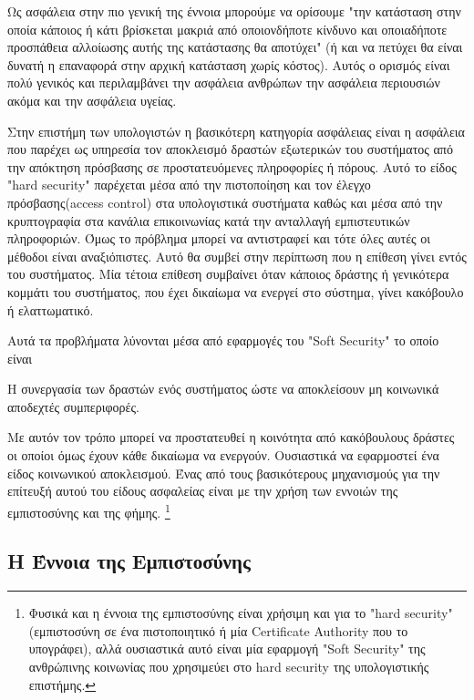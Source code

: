 Ως ασφάλεια στην πιο γενική της έννοια μπορούμε να ορίσουμε "την κατάσταση στην οποία κάποιος ή κάτι βρίσκεται μακριά από οποιονδήποτε κίνδυνο και οποιαδήποτε προσπάθεια αλλοίωσης αυτής της κατάστασης θα αποτύχει" (ή και να πετύχει θα είναι δυνατή η επαναφορά στην αρχική κατάσταση χωρίς κόστος). Αυτός ο ορισμός είναι πολύ γενικός και περιλαμβάνει την ασφάλεια ανθρώπων την ασφάλεια περιουσιών ακόμα και την ασφάλεια υγείας.

Στην επιστήμη των υπολογιστών η βασικότερη κατηγορία ασφάλειας είναι η ασφάλεια που παρέχει ως υπηρεσία τον αποκλεισμό δραστών εξωτερικών του συστήματος από την απόκτηση πρόσβασης σε προστατευόμενες πληροφορίες ή πόρους. Αυτό το είδος "hard security" παρέχεται μέσα από την πιστοποίηση και τον έλεγχο πρόσβασης(access control) στα υπολογιστικά συστήματα καθώς και μέσα από την κρυπτογραφία στα κανάλια επικοινωνίας κατά την ανταλλαγή εμπιστευτικών πληροφοριών. Όμως το πρόβλημα μπορεί να αντιστραφεί και τότε όλες αυτές οι μέθοδοι είναι αναξιόπιστες. Αυτό θα συμβεί στην περίπτωση που η επίθεση γίνει εντός του συστήματος. Μία τέτοια επίθεση συμβαίνει όταν κάποιος δράστης ή γενικότερα κομμάτι του συστήματος, που έχει δικαίωμα να ενεργεί στο σύστημα, γίνει κακόβουλο ή ελαττωματικό. 

Αυτά τα προβλήματα λύνονται μέσα από εφαρμογές του "Soft Security" το οποίο είναι 

\begin{soft_sec}
Η συνεργασία των δραστών ενός συστήματος ώστε να αποκλείσουν μη κοινωνικά αποδεχτές συμπεριφορές. 
\end{soft_sec}

Με αυτόν τον τρόπο μπορεί να προστατευθεί η κοινότητα από κακόβουλους δράστες οι οποίοι όμως έχουν κάθε δικαίωμα να ενεργούν. Ουσιαστικά να εφαρμοστεί ένα είδος κοινωνικού αποκλεισμού. Ένας από τους βασικότερους μηχανισμούς για την επίτευξή αυτού του είδους ασφαλείας είναι με την χρήση των εννοιών της εμπιστοσύνης και της φήμης. \footnote{Φυσικά και η έννοια της εμπιστοσύνης είναι χρήσιμη και για το "hard security" (εμπιστοσύνη σε ένα πιστοποιητικό ή μία Certificate Authority που το υπογράφει), αλλά ουσιαστικά αυτό είναι μία εφαρμογή "Soft Security" της ανθρώπινης κοινωνίας που χρησιμεύει στο hard security της υπολογιστικής επιστήμης.} 



\subsection{Η Έννοια της Εμπιστοσύνης}\label{sec:trust}

